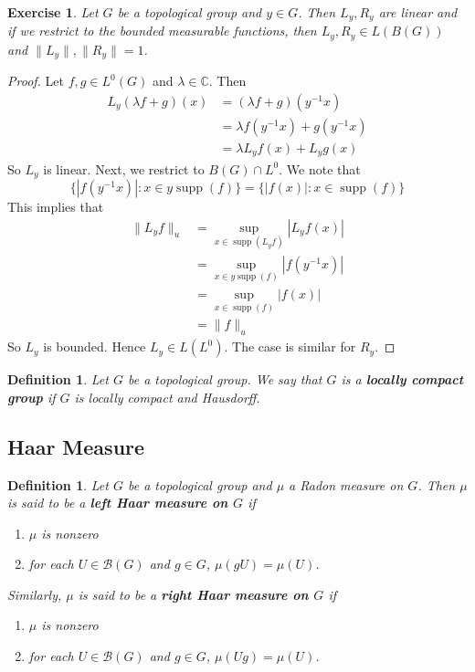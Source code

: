 \documentclass[12pt]{amsart}
\newtheorem{defn}[thm]{Definition}
\newtheorem{ex}[thm]{Exercise}
\DeclareMathOperator{\supp}{supp}
\newcommand{\lam}{\lambda}
\newcommand{\C}{\mathbb{C}}
\newcommand{\MB}{\mathcal{B}}
\begin{document}
	\begin{ex}
		Let $G$ be a topological group and $y \in G$. Then $L_y, R_y$ are linear and if we restrict to the bounded measurable functions, then  $L_y, R_y \in L(B(G))$ and $\|L_y\|, \|R_y\| = 1$. 
	\end{ex}
	
	\begin{proof}
		Let $f, g \in L^0(G)$ and $\lam \in \C$. Then 
		\begin{align*}
			L_y(\lam f+g)(x)
			& = (\lam f+g)(y^{-1}x) \\
			& = \lam f(y^{-1}x) + g(y^{-1}x) \\
			& = \lam L_yf(x) + L_yg(x)
		\end{align*}
		So $L_y$ is linear. Next, we restrict to $B(G) \cap L^0$. We note that $$\{|f(y^{-1}x)|: x \in y\supp(f)\} = \{|f(x)|: x \in \supp(f)\}$$ This implies that 
		\begin{align*}
			\|L_yf \|_u 
			& = \sup_{x \in \supp(L_yf)} |L_yf(x)| \\
			& = \sup_{x \in y\supp(f)} |f(y^{-1}x)| \\
			& = \sup_{x \in \supp(f)} |f(x)| \\ 
			& = \|f\|_u
		\end{align*} 
		So $L_y$ is bounded. Hence $L_y \in L(L^0)$. The case is similar for $R_y$.
	\end{proof}
	
	\begin{defn}
		Let $G$ be a topological group. We say that $G$ is a \textbf{locally compact group} if $G$ is locally compact and Hausdorff.
	\end{defn}








	\newpage
	
	\subsection{Haar Measure}
	
	\begin{defn}
		Let $G$ be a topological group and $\mu$ a Radon measure on $G$. Then $\mu$ is said to be a \textbf{left Haar measure on $G$} if 
		\begin{enumerate}
			\item $\mu$ is nonzero  
			\item for each $U \in \MB(G)$ and $g \in G$, $\mu(gU) = \mu(U)$.  
		\end{enumerate}
		Similarly, $\mu$ is said to be a \textbf{right Haar measure on $G$} if 
		\begin{enumerate}
			\item $\mu$ is nonzero  
			\item for each $U \in \MB(G)$ and $g \in G$, $\mu(Ug) = \mu(U)$.  
		\end{enumerate}
	\end{defn}
	
\end{document}
